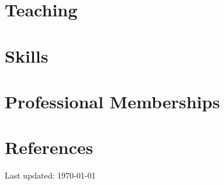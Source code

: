 \documentclass{prometheus_cv}
\begin{document}
\section{Teaching}


\section{Skills}


\section{Professional Memberships}

\section{References}






\begin{center}
  \begin{footnotesize}
    Last updated: \today \\
  \end{footnotesize}
\end{center}
\end{document}

